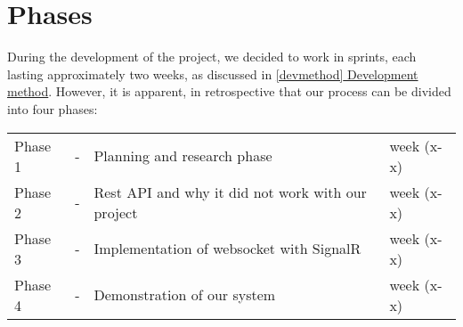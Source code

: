\section{Phases}
During the development of the project, we decided to work in sprints, each lasting approximately two weeks, as discussed in \hyperref[devmethod]{\ref{devmethod} Development method}. However, it is apparent, in retrospective that our process can be divided into four phases:

\begin{center}
	\begin{tabular}{lcll}
		Phase 1 & - & Planning and research phase & week (x-x) \\
		Phase 2& - & Rest API and why it did not work with our project& week (x-x) \\
		Phase 3 & - & Implementation of websocket with SignalR & week (x-x) \\
		Phase 4 & - & Demonstration of our system & week (x-x) 
	\end{tabular}
\end{center}